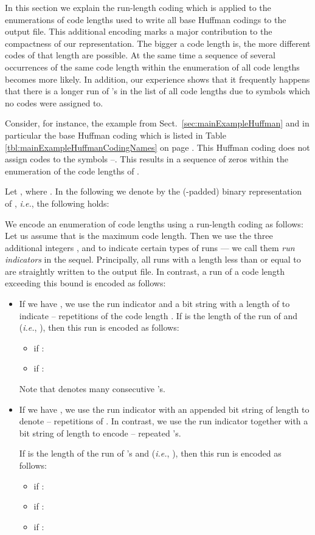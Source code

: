 \documentclass[12pt]{llncs}
\newcommand{\hairsp}{\hspace{1pt}}\newcommand{\TODO}{\textcolor{red}{\bf TODO!}\xspace}
\newcommand{\ie}{\mbox{\textit{i.\hairsp{}e.}}\xspace}
\begin{document}
In this section we explain the run-length coding which is applied to the enumerations of code lengths used to write all base Huffman codings to the output file. This additional encoding marks a major contribution to the compactness of our representation. The bigger a code length is, the more different codes of that length are possible. At the same time a sequence of several occurrences of the same code length within the enumeration of all code lengths becomes more likely. In addition, our experience shows that it frequently happens that there is a longer run of 's in the list of all code lengths due to symbols which no codes were assigned to. 
\begin{example}
Consider, for instance, the example from Sect.~\ref{sec:mainExampleHuffman} and in particular the base Huffman coding  which is listed in Table \ref{tbl:mainExampleHuffmanCodingNames} on page \pageref{tbl:mainExampleHuffmanCodingNames}. This Huffman coding does not assign codes to the symbols --. This results in a sequence of  zeros within the enumeration of the code lengths of .
\end{example}
\begin{definition}
	Let , where . In the following we denote by  the (-padded) binary representation  of , \ie, the following holds:

\end{definition}
We encode an enumeration of code lengths using a run-length coding as follows: Let us assume that  is the maximum code length. Then we use the three additional integers ,  and  to indicate certain types of runs --- we call them \emph{run indicators} in the sequel. Principally, all runs with a length less than or equal to  are straightly written to the output file. In contrast, a run of a code length  exceeding this bound is encoded as follows:
\begin{itemize}
	\item If we have , we use the run indicator  and a bit string with a length of  to indicate -- repetitions of the code length . If  is the length of the run of  and  (\ie, ), then this run is encoded as follows:
		\begin{itemize}
			\item if :
				
			\item if :
				
		\end{itemize}
		Note that  denotes  many consecutive 's.
	\item If we have , we use the run indicator  with an appended bit string of length  to  denote -- repetitions of . In contrast, we use the run indicator  together with a bit string of length  to encode -- repeated 's.
	
		If  is the length of the run of 's and  (\ie, ), then this run is encoded as follows:
		\begin{itemize}
			\item if :
				
			\item if :
				
			\item if :
				
		\end{itemize}
\end{itemize}
\end{document}
